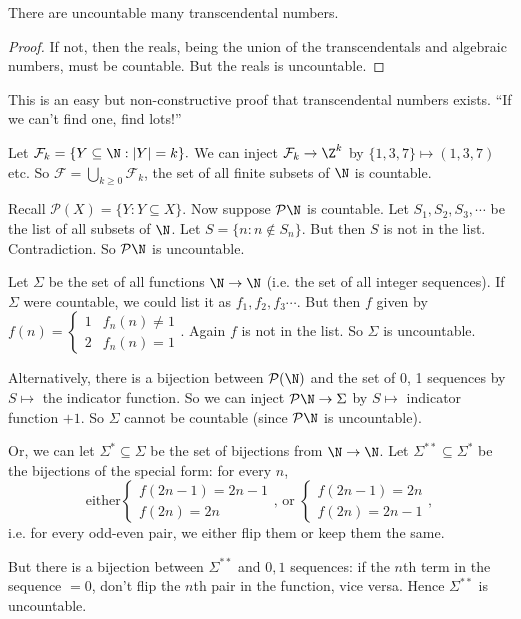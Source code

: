 \documentclass[a4paper]{article}
\begin{document}
  \begin{cor}
    There are uncountable many transcendental numbers.
  \end{cor}

  \begin{proof}
    If not, then the reals, being the union of the transcendentals and algebraic numbers, must be countable. But the reals is uncountable.
  \end{proof}
  \note This is an easy but non-constructive proof that transcendental numbers exists. ``If we can't find one, find lots!''

  \begin{eg}
    Let $\mathcal{F}_k = \{Y\subseteq \N: |Y| = k\}.$ We can inject $\mathcal{F}_k \to \Z^k$ by $\{1, 3, 7\}\mapsto (1, 3, 7)$ etc. So $\mathcal{F} = \bigcup_{k\geq 0}\mathcal{F}_k$, the set of all finite subsets of $\N$ is countable.
  \end{eg}

  \begin{eg}
    Recall $\mathcal{P}(X) = \{Y: Y\subseteq X\}$. Now suppose $\mathcal{P}\N$ is countable. Let $S_1,S_2,S_3, \cdots$ be the list of all subsets of $\N$. Let $S = \{n: n\not\in S_n\}$. But then $S$ is not in the list. Contradiction. So $\mathcal{P}\N$ is uncountable.
  \end{eg}

  \begin{eg}
    Let $\Sigma$ be the set of all functions $\N\to \N$ (i.e. the set of all integer sequences). If $\Sigma$ were countable, we could list it as $f_1, f_2, f_3\cdots$. But then $f$ given by $f(n) = 
    \begin{cases}
      1 & f_n(n) \not= 1\\
      2 & f_n(n) = 1
    \end{cases}$. Again $f$ is not in the list. So $\Sigma$ is uncountable.

    Alternatively, there is a bijection between $\mathcal{P}(\N)$ and the set of 0, 1 sequences by $S\mapsto$ the indicator function. So we can inject $\mathcal{P}\N \to \Sigma$ by $S\mapsto $ indicator function $+1$. So $\Sigma$ cannot be countable (since $\mathcal{P}\N$ is uncountable).

    Or, we can let $\Sigma^*\subseteq \Sigma$ be the set of bijections from $\N\to\N$. Let $\Sigma^{**}\subseteq \Sigma^*$ be the bijections of the special form: for every $n$,
    \[
      \text{either}
      \begin{cases}
        f(2n - 1) = 2n - 1\\
        f(2n) = 2n
      \end{cases}\text{, or }
      \begin{cases}
        f(2n - 1) = 2n\\
        f(2n) = 2n - 1
      \end{cases},
    \]
    i.e. for every odd-even pair, we either flip them or keep them the same.

    But there is a bijection between $\Sigma^{**}$ and $0,1$ sequences: if the $n$th term in the sequence $ = 0$, don't flip the $n$th pair in the function, vice versa. Hence $\Sigma^{**}$ is uncountable. 
  \end{eg}
\end{document}
